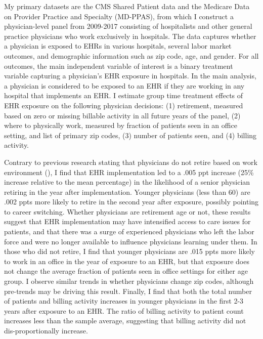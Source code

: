 \documentclass[11pt]{article}
\begin{document}
My primary datasets are the CMS Shared Patient data and the Medicare Data on Provider Practice and Specialty (MD-PPAS), from which I construct a physician-level panel from 2009-2017 consisting of hospitalists and other general practice physicians who work exclusively in hospitals. The data captures whether a physician is exposed to EHRs in various hospitals, several labor market outcomes, and demographic information such as zip code, age, and gender. For all outcomes, the main independent variable of interest is a binary treatment variable capturing a physician's EHR exposure in hospitals. In the main analysis, a physician is considered to be exposed to an EHR if they are working in any hospital that implements an EHR. I estimate group time treatment effects of EHR exposure on the following physician decisions: (1) retirement, measured based on zero or missing billable activity in all future years of the panel, (2) where to physically work, measured by fraction of patients seen in an office setting, and list of primary zip codes, (3) number of patients seen, and (4) billing activity. 

Contrary to previous research stating that physicians do not retire based on work environment (\cite{Bahrami2002}), I find that EHR implementation led to a .005 ppt increase (25\% increase relative to the mean percentage) in the likelihood of a senior physician retiring in the year after implementation. Younger physicians (less than 60) are .002 ppts more likely to retire in the second year after exposure, possibly pointing to career switching. Whether physicians are retirement age or not, these results suggest that EHR implementation may have intensified access to care issues for patients, and that there was a surge of experienced physicians who left the labor force and were no longer available to influence physicians learning under them. In those who did not retire, I find that younger physicians are .015 ppts more likely to work in an office in the year of exposure to an EHR, but that exposure does not change the average fraction of patients seen in office settings for either age group. I observe similar trends in whether physicians change zip codes, although pre-trends may be driving this result. Finally, I find that both the total number of patients and billing activity increases in younger physicians in the first 2-3 years after exposure to an EHR. The ratio of billing activity to patient count increases less than the sample average, suggesting that billing activity did not dis-proportionally increase. 
\end{document}
